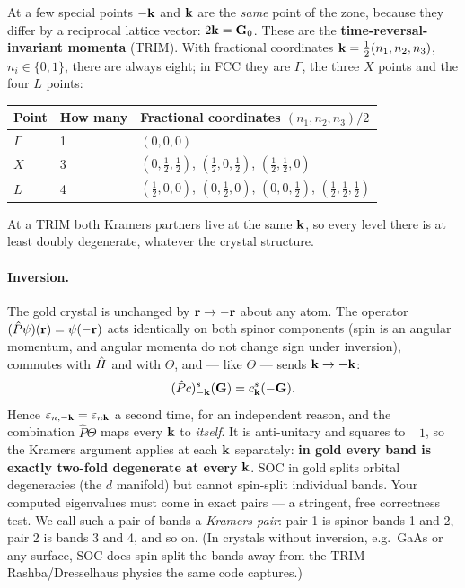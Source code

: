 At a few special points $-\mathbf{k}$ and $\mathbf{k}$ are the \emph{same} point of the
zone, because they differ by a reciprocal lattice vector: $2\mathbf{k} = \mathbf{G}_0$.
These are the \textbf{time-reversal-invariant momenta} (TRIM). With
fractional coordinates $\mathbf{k} = \tfrac12(n_1,n_2,n_3)$, $n_i\in\{0,1\}$,
there are always eight; in FCC they are $\Gamma$, the three $X$ points and
the four $L$ points:
\begin{center}
\begin{tabular}{@{}lll@{}}
\toprule
Point & How many & Fractional coordinates $(n_1,n_2,n_3)/2$\\
\midrule
$\Gamma$ & 1 & $(0,0,0)$\\
$X$ & 3 & $(0,\tfrac12,\tfrac12)$, $(\tfrac12,0,\tfrac12)$,
$(\tfrac12,\tfrac12,0)$\\
$L$ & 4 & $(\tfrac12,0,0)$, $(0,\tfrac12,0)$, $(0,0,\tfrac12)$,
$(\tfrac12,\tfrac12,\tfrac12)$\\
\bottomrule
\end{tabular}
\end{center}
At a TRIM both Kramers partners live at the same $\mathbf{k}$, so every level
there is at least doubly degenerate, whatever the crystal structure.

\paragraph{Inversion.} The gold crystal is unchanged by
$\mathbf{r}\to-\mathbf{r}$ about any atom. The operator $(\hat P\psi)(\mathbf{r}) = \psi(-\mathbf{r})$
acts identically on both spinor components (spin is an angular momentum,
and angular momenta do not change sign under inversion), commutes with
$\hat{H}$ and with $\Theta$, and --- like $\Theta$ --- sends $\mathbf{k}\to-\mathbf{k}$:
\begin{equation}
(\hat P c)^{s}_{-\mathbf{k}}(\mathbf{G}) = c^{s}_{\mathbf{k}}(-\mathbf{G}) .
\label{eq:pcoeff}
\end{equation}
Hence $\varepsilon_{n,-\mathbf{k}}=\varepsilon_{n\mathbf{k}}$ a second time, for an
independent reason, and the combination $\hat P\Theta$ maps every $\mathbf{k}$ to
\emph{itself}. It is anti-unitary and squares to $-1$, so the Kramers
argument applies at each $\mathbf{k}$ separately: \textbf{in gold every band is
exactly two-fold degenerate at every} $\mathbf{k}$. SOC in gold splits orbital
degeneracies (the $d$ manifold) but cannot spin-split individual bands.
Your computed eigenvalues must come in exact pairs --- a stringent, free
correctness test. We call such a pair of bands a \emph{Kramers pair}: pair
1 is spinor bands 1 and 2, pair 2 is bands 3 and 4, and so on. (In
crystals without inversion, e.g.\ GaAs or any surface, SOC does spin-split
the bands away from the TRIM --- Rashba/Dresselhaus physics the same code
captures.)

